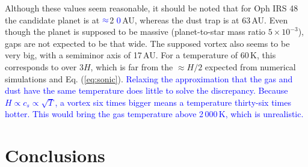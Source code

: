 \documentclass[apj]{emulateapj}
\def\blue#1{\textcolor{blue}{ #1}}
\newcommand{\Eq}[1]{Eq. (\ref{#1})}
\newcommand{\eq}[1]{\Eq{#1}}
\newcommand{\beq}{\begin{equation}}
\newcommand{\eeq}{\end{equation}}
\newcommand{\St}{{\rm St}}
\begin{document}
Although these values seem reasonable, it should be noted that
for Oph IRS 48 the candidate planet is at $\blue{\approx}$2\blue{0}\,AU, whereas the dust trap is at 63\,AU. Even though the
planet is supposed to be massive (planet-to-star mass ratio
$5\times10^{-3}$), gaps are not expected to be that wide. The supposed
vortex also seems to be very big, with a semiminor axis of 17\,AU. For
a temperature of 60\,K, this corresponds to over 3$H$, which is far
from the $\approx H/2$ expected from numerical simulations and
\eq{eq:sonic}. \blue{Relaxing the approximation that the gas and dust 
have the same temperature does little to solve the
discrepancy. Because $H \propto c_s \propto \sqrt{T}$, a vortex
six times bigger means a temperature thirty-six times hotter. This would 
bring the gas temperature above 2\,000\,K, which is unrealistic.}









\section{Conclusions}
\end{document}
